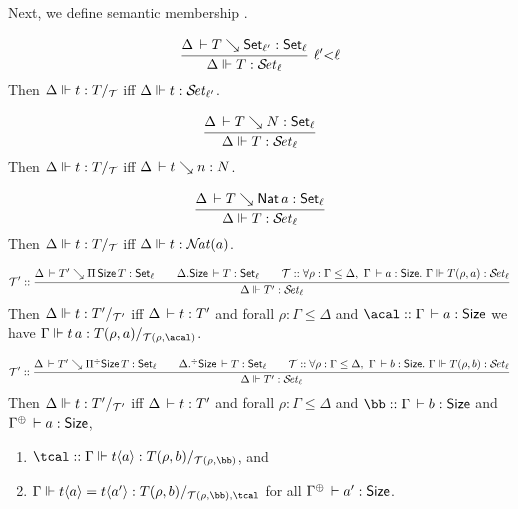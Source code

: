 \documentclass[acmlarge,review,anonymous]{acmart}\settopmatter{printfolios=true}
\begin{document}
Next, we define semantic membership .
\begin{caselist}

\nextcase
\[
  \rux{\Delta \der T \evalsto \Set[\ell'] : \Set[\ell]
     }{\sty \Delta T \ell
     }{\ell' {<} \ell}
\]
Then $\Delta \Vdash t : T /_{\mathcal{T}}$ iff $\Delta \Vdash t : {\mathcal{S}\!\mathit{et}_{\ell'}}$.

\nextcase
\[
  \ru{\Delta \der T \evalsto N : \Set[\ell]
    }{\sty \Delta T \ell}
\]
Then $\Delta \Vdash t : T /_{\mathcal{T}}$ iff $\Delta \,\vdash t \searrow n : N$.

\nextcase
\[
  \ru{\Delta \der T \evalsto \Nat a : \Set[\ell]
    }{\sty \Delta T \ell}
\]
Then $\Delta \Vdash t : T /_{\mathcal{T}}$ iff $\Delta \Vdash t : {\mathcal{N}\!\mathit{at}}(a)$.

\nextcase %
\[
  \T' ::
  \rul{\Delta \der T' \evalsto \piT \Size T : \Set[\ell] \qquad
       \cext \Delta \Size \der T : \Set[\ell] \qquad
      \T :: \forall \rho : \Gamma \leq \Delta,~\Gamma \der a : \Size.~
        \sty \Gamma {T(\rho,a)} \ell \\
    }{\sty \Delta {T'} \ell}
\]
Then $\Delta \Vdash t : T' /_{\mathcal{T}'}$ iff $\Delta \,\vdash t : T'$ and
forall $\rho : \Gamma \leq \Delta$ and $\acal :: \Gamma \der a : \Size$
we have $\sttmd \Gamma {t\,a} {T(\rho,a)} {\T(\rho,\acal)}$.

\nextcase %
\[
  \T' ::
  \rul{\Delta \der T' \evalsto \erpiT \Size T : \Set[\ell] \qquad
       \erext \Delta \Size \der T : \Set[\ell] \qquad
      \T :: \forall \rho : \Gamma \leq \Delta,~\Gamma \der b : \Size.~
        \sty \Gamma {T(\rho,b)} \ell \\
    }{\sty \Delta {T'} \ell}
\]
Then $\Delta \Vdash t : T' /_{\mathcal{T}'}$ iff $\Delta \,\vdash t : T'$ and
forall $\rho : \Gamma \leq \Delta$ and $\bb :: \Gamma \der b : \Size$ and  $\resurrect\Gamma \der a : \Size$,
\begin{enumerate}
\item $\tcal :: \sttmd \Gamma {t \ann a} {T(\rho,b)} {\T(\rho,\bb)}$, and
\item $\sttmeqd \Gamma {t \ann a} {t \ann {a'}} {T(\rho,b)} {\T(\rho,\bb)} {\tcal}$ for all $\resurrect\Gamma \der a' : \Size$.
\end{enumerate}



\end{caselist}
\end{document}
